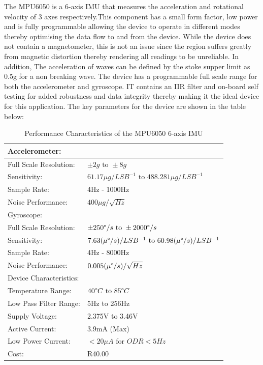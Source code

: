 The MPU6050 is a 6-axis IMU that measures the acceleration and rotational velocity of 3 axes respectively.This component has a small form factor, low power and is fully programmable allowing the device to operate in different modes thereby optimising the data flow to and from the device. While the device does not contain a magnetometer, this is not an issue since the region suffers greatly from magnetic distortion \cite{kohout2015device} thereby rendering all readings to be unreliable. In addition, The acceleration of waves can be defined by the stoke supper limit \cite{kohout2015device} as 0.5g for a non breaking wave. The device has a programmable full scale range for both the accelerometer and gyroscope. IT contains an IIR filter and on-board self testing for added robustness and data integrity thereby making it  the ideal device for this application. The key parameters for the device are shown in the table below:
\begin{table}[H]
    \centering
    \caption{Performance Characteristics of the MPU6050 6-axis IMU }
    \begin{tabular}{|l|l|}
    \multicolumn{2}{l}{Accelerometer:}\\
    \hline
       Full Scale Resolution:  & $ \pm 2g \text{ to } \pm8g$\\
       \hline
        Sensitivity: &  $61.17 \mu g/LSB^{-1} \text{ to } 488.281\mu g/LSB^{-1}$\\
         \hline
        Sample Rate: & 4Hz - 1000Hz\\
         \hline
        Noise Performance: & $400\mu g/\sqrt{Hz}$\\
         \hline
         \multicolumn{2}{l}{Gyroscope:}\\
         \hline
           Full Scale Resolution:  & $\pm 250\degree/s \text{ to } \pm 2000\degree/s $ \\
       \hline
        Sensitivity: &  $7.63(\mu\degree/s)/LSB^{-1} \text{ to } 60.98(\mu\degree/s)/LSB^{-1}$\\
         \hline
        Sample Rate: & 4Hz - 8000Hz\\
         \hline
        Noise Performance: & $0.005(\mu\degree/s)/\sqrt{Hz}$\\
         \hline
         \multicolumn{2}{l}{Device Characteristics:}\\
         \hline
         Temperature Range: & $40\degree C \text{ to } 85 \degree C$\\
         \hline
         Low Pass Filter Range: & 5Hz to 256Hz \\
         \hline
         Supply Voltage: & 2.375V to 3.46V\\
         \hline 
         Active Current: & 3.9mA (Max) \\
         \hline
         Low Power Current: & $< 20 \mu A$ for $ODR < 5Hz$\\
         \hline
         Cost: & R40.00 \footnotemark\\
         \hline
    \end{tabular}
    \label{tab:mpu_specs}
\end{table}


